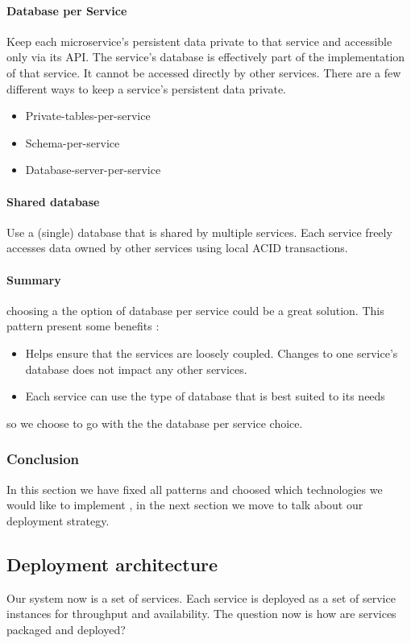 \paragraph{Database per Service}
\label{sec:sec01}
Keep each microservice's persistent data private to that service and accessible only via its API. 
The service's database is effectively part of the implementation of that service. It cannot be accessed directly by other services.
There are a few different ways to keep a service's persistent data private.
\begin{itemize}
  \item Private-tables-per-service
  \item Schema-per-service
  \item Database-server-per-service
 \end{itemize}
\paragraph{Shared database}
\label{sec:sec01}
Use a (single) database that is shared by multiple services. 
Each service freely accesses data owned by other services using local ACID transactions.

\paragraph{Summary}
\label{sec:sec01}
choosing a the option of database per service could be a great solution. This pattern present some benefits :
\begin{itemize}
  \item Helps ensure that the services are loosely coupled. 
  Changes to one service's database does not impact any other services.
  \item Each service can use the type of database that is best suited to its needs
 \end{itemize}
so we choose to go with the the database per service choice.
\newpage
\subsubsection{Conclusion}
\label{sec:sec01}
In this section we have fixed all patterns and choosed which technologies we would like to implement , 
in the next section we move to talk about our deployment strategy.

\subsection{Deployment architecture} 
\label{sec:sec01}
Our system now is a set of services. Each service is deployed as a set of service instances for throughput and availability.
The question now is how are services packaged and deployed?
